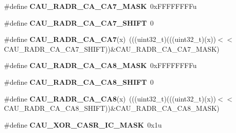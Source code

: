 \begin{DoxyCompactItemize}
\item 
\#define {\bfseries C\+A\+U\+\_\+\+R\+A\+D\+R\+\_\+\+C\+A\+\_\+\+C\+A7\+\_\+\+M\+A\+SK}~0x\+F\+F\+F\+F\+F\+F\+F\+Fu\hypertarget{group__CAU__Register__Masks_gab7bd0a8a36b9bfe8642f27d09b6d24f6}{}\label{group__CAU__Register__Masks_gab7bd0a8a36b9bfe8642f27d09b6d24f6}

\item 
\#define {\bfseries C\+A\+U\+\_\+\+R\+A\+D\+R\+\_\+\+C\+A\+\_\+\+C\+A7\+\_\+\+S\+H\+I\+FT}~0\hypertarget{group__CAU__Register__Masks_ga119c6fa0ada08c282b33b5585d32983c}{}\label{group__CAU__Register__Masks_ga119c6fa0ada08c282b33b5585d32983c}

\item 
\#define {\bfseries C\+A\+U\+\_\+\+R\+A\+D\+R\+\_\+\+C\+A\+\_\+\+C\+A7}(x)~(((uint32\+\_\+t)(((uint32\+\_\+t)(x))$<$$<$C\+A\+U\+\_\+\+R\+A\+D\+R\+\_\+\+C\+A\+\_\+\+C\+A7\+\_\+\+S\+H\+I\+FT))\&C\+A\+U\+\_\+\+R\+A\+D\+R\+\_\+\+C\+A\+\_\+\+C\+A7\+\_\+\+M\+A\+SK)\hypertarget{group__CAU__Register__Masks_gafcc3228ff234a13b8752ff5c6fc6a37f}{}\label{group__CAU__Register__Masks_gafcc3228ff234a13b8752ff5c6fc6a37f}

\item 
\#define {\bfseries C\+A\+U\+\_\+\+R\+A\+D\+R\+\_\+\+C\+A\+\_\+\+C\+A8\+\_\+\+M\+A\+SK}~0x\+F\+F\+F\+F\+F\+F\+F\+Fu\hypertarget{group__CAU__Register__Masks_ga0becdc994c7da7ab67251bd2da040493}{}\label{group__CAU__Register__Masks_ga0becdc994c7da7ab67251bd2da040493}

\item 
\#define {\bfseries C\+A\+U\+\_\+\+R\+A\+D\+R\+\_\+\+C\+A\+\_\+\+C\+A8\+\_\+\+S\+H\+I\+FT}~0\hypertarget{group__CAU__Register__Masks_ga5dde041188525dacccc86994f3b4a62c}{}\label{group__CAU__Register__Masks_ga5dde041188525dacccc86994f3b4a62c}

\item 
\#define {\bfseries C\+A\+U\+\_\+\+R\+A\+D\+R\+\_\+\+C\+A\+\_\+\+C\+A8}(x)~(((uint32\+\_\+t)(((uint32\+\_\+t)(x))$<$$<$C\+A\+U\+\_\+\+R\+A\+D\+R\+\_\+\+C\+A\+\_\+\+C\+A8\+\_\+\+S\+H\+I\+FT))\&C\+A\+U\+\_\+\+R\+A\+D\+R\+\_\+\+C\+A\+\_\+\+C\+A8\+\_\+\+M\+A\+SK)\hypertarget{group__CAU__Register__Masks_ga60e97a6dd9f8f0ba91c511ee4b8cb438}{}\label{group__CAU__Register__Masks_ga60e97a6dd9f8f0ba91c511ee4b8cb438}

\item 
\#define {\bfseries C\+A\+U\+\_\+\+X\+O\+R\+\_\+\+C\+A\+S\+R\+\_\+\+I\+C\+\_\+\+M\+A\+SK}~0x1u\hypertarget{group__CAU__Register__Masks_gaca3c61b76adc9812ea3851c4b704c43f}{}\label{group__CAU__Register__Masks_gaca3c61b76adc9812ea3851c4b704c43f}


\end{DoxyCompactItemize}
